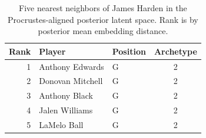 \begin{table}[htbp]
  \centering\small
  \begin{tabular}{rllc}
    \toprule
    Rank & Player & Position & Archetype \\
    \midrule
    1 & Anthony Edwards & G & 2 \\
    2 & Donovan Mitchell & G & 2 \\
    3 & Anthony Black & G & 2 \\
    4 & Jalen Williams & G & 2 \\
    5 & LaMelo Ball & G & 2 \\
    \bottomrule
  \end{tabular}
  \caption{Five nearest neighbors of James Harden in the Procrustes-aligned posterior latent space. Rank is by posterior mean embedding distance.}
  \label{tab:James_Harden_neighbors}
\end{table}

